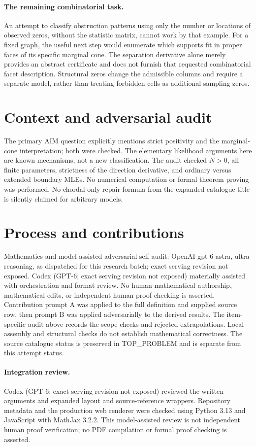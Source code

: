 \documentclass[11pt]{article}
\begin{document}
\paragraph{The remaining combinatorial task.}
An attempt to classify obstruction patterns using only the number or
locations of observed zeros, without the statistic matrix, cannot work
by that example. For a fixed graph, the useful next step would enumerate
which supports fit in proper faces of its specific marginal cone. The
separation derivative alone merely provides an abstract certificate and
does not furnish that requested combinatorial facet description. Structural
zeros change the admissible columns and require a separate model, rather
than treating forbidden cells as additional sampling zeros.

\section{Context and adversarial audit}
The primary AIM question explicitly mentions strict positivity and the
marginal-cone interpretation; both were checked. The elementary likelihood
arguments here are known mechanisms, not a new classification. The audit
checked $N>0$, all finite parameters, strictness of the direction derivative,
and ordinary versus extended boundary MLEs. No numerical computation or
formal theorem proving was performed. No chordal-only repair formula from
the expanded catalogue title is silently claimed for arbitrary models.

\section{Process and contributions}
Mathematics and model-assisted adversarial self-audit: OpenAI gpt-6-astra, ultra reasoning, as dispatched for this research batch; exact serving revision not exposed. Codex (GPT-6; exact serving revision not exposed) materially assisted with orchestration and format review. No human mathematical authorship, mathematical edits, or independent human proof checking is asserted.
Contribution prompt A was applied to the full definition and supplied source row, then prompt B was applied adversarially to the derived results. The item-specific audit above records the scope checks and rejected extrapolations. Local assembly and structural checks do not establish mathematical correctness. The source catalogue status is preserved in TOP\_PROBLEM and is separate from this attempt status.
\paragraph{Integration review.} Codex (GPT-6; exact serving revision not exposed) reviewed the written arguments and expanded layout and source-reference wrappers. Repository metadata and the production web renderer were checked using Python 3.13 and JavaScript with MathJax 3.2.2. This model-assisted review is not independent human proof verification; no PDF compilation or formal proof checking is asserted.
\end{document}
